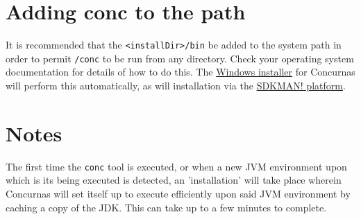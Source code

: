 \documentclass[conc-doc]{subfiles}
\begin{document}
\section{Adding conc to the path}
It is recommended that the \lstinline[language=None]{<installDir>/bin} be added to the system path in order to permit \lstinline[language=None]{/conc} to be run from any directory. Check your operating system documentation for details of how to do this. The \href{https://concurnas.com/download.html}{Windows installer} for Concurnas will perform this automatically, as will installation via the \href{https://sdkman.io/sdks#concurnas}{SDKMAN! platform}.

\section{Notes}
The first time the \lstinline[language=None]{conc} tool is executed, or when a new JVM environment upon which is its being executed is detected, an 'installation' will take place wherein Concurnas will set itself up to execute efficiently upon said JVM environment by caching a copy of the JDK. This can take up to a few minutes to complete.
\end{document}
